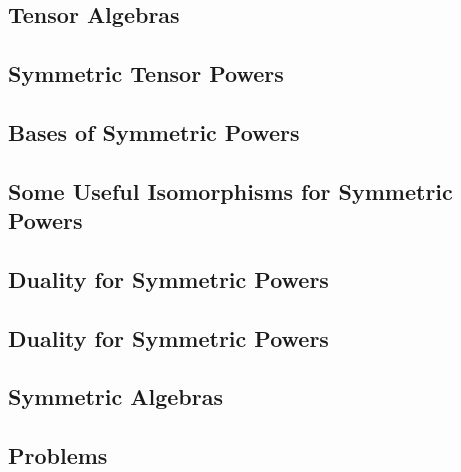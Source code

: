 \documentclass[a4paper]{article}
\begin{document}
\subsection{ Tensor Algebras} %

\subsection{ Symmetric Tensor Powers} %

\subsection{ Bases of Symmetric Powers} %

\subsection{ Some Useful Isomorphisms for Symmetric Powers} %

\subsection{ Duality for Symmetric Powers} %

\subsection{ Duality for Symmetric Powers} %

\subsection{ Symmetric Algebras} %

\subsection{ Problems} %
\end{document}
